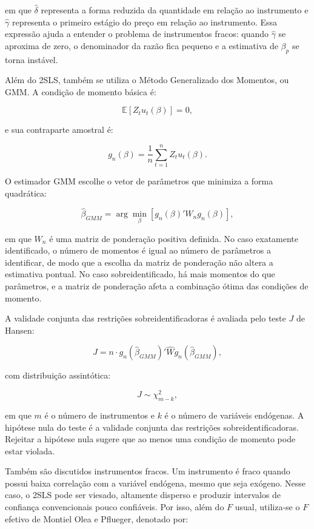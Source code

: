 \documentclass[12pt,a4paper]{article}
\begin{document}
em que \(\hat{\delta}\) representa a forma reduzida da quantidade em relação ao instrumento e \(\hat{\gamma}\) representa o primeiro estágio do preço em relação ao instrumento. Essa expressão ajuda a entender o problema de instrumentos fracos: quando \(\hat{\gamma}\) se aproxima de zero, o denominador da razão fica pequeno e a estimativa de \(\beta_p\) se torna instável.

Além do 2SLS, também se utiliza o Método Generalizado dos Momentos, ou GMM. A condição de momento básica é:

\[
\mathbb{E}[Z_t u_t(\beta)] = 0,
\tag{12}
\label{eq:momento_gmm}
\]

e sua contraparte amostral é:

\[
g_n(\beta)
=
\frac{1}{n}\sum_{t=1}^{n} Z_t u_t(\beta).
\tag{13}
\label{eq:momento_amostral}
\]

O estimador GMM escolhe o vetor de parâmetros que minimiza a forma quadrática:

\[
\hat{\beta}_{GMM}
=
\arg\min_{\beta}
\left[
g_n(\beta)' W_n g_n(\beta)
\right],
\tag{14}
\label{eq:gmm_objetivo}
\]

em que \(W_n\) é uma matriz de ponderação positiva definida. No caso exatamente identificado, o número de momentos é igual ao número de parâmetros a identificar, de modo que a escolha da matriz de ponderação não altera a estimativa pontual. No caso sobreidentificado, há mais momentos do que parâmetros, e a matriz de ponderação afeta a combinação ótima das condições de momento.

A validade conjunta das restrições sobreidentificadoras é avaliada pelo teste \(J\) de Hansen:

\[
J
=
n \cdot g_n(\hat{\beta}_{GMM})'
\hat{W}
g_n(\hat{\beta}_{GMM}),
\tag{15}
\label{eq:hansen_j}
\]

com distribuição assintótica:

\[
J \sim \chi^2_{m-k},
\tag{16}
\label{eq:hansen_dist}
\]

em que \(m\) é o número de instrumentos e \(k\) é o número de variáveis endógenas. A hipótese nula do teste é a validade conjunta das restrições sobreidentificadoras. Rejeitar a hipótese nula sugere que ao menos uma condição de momento pode estar violada.

Também são discutidos instrumentos fracos. Um instrumento é fraco quando possui baixa correlação com a variável endógena, mesmo que seja exógeno. Nesse caso, o 2SLS pode ser viesado, altamente disperso e produzir intervalos de confiança convencionais pouco confiáveis. Por isso, além do \(F\) usual, utiliza-se o \(F\) efetivo de Montiel Olea e Pflueger, denotado por:
\end{document}
